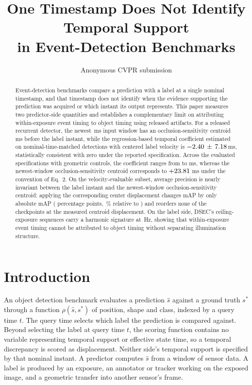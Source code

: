 \documentclass[10pt,twocolumn,letterpaper]{article}
\title{One Timestamp Does Not Identify Temporal Support\\
in Event-Detection Benchmarks}
\author{Anonymous CVPR submission}
\begin{document}
\maketitle

\begin{abstract}
Event-detection benchmarks compare a prediction with a label at a single
nominal timestamp, and that timestamp does not identify when the evidence
supporting the prediction was acquired or which instant its output represents.
This paper measures two predictor-side quantities and establishes a complementary
limit on attributing within-exposure event timing to object timing using released
artifacts. For a released
recurrent detector, the newest \rvtWindow\,ms input window has an
occlusion-sensitivity centroid \rvtCentroidMagMeas\,ms before the label instant,
while the regression-based temporal coefficient estimated on nominal-time-matched
detections with centered label velocity is
$-2.40\,\pm\,7.18$\,ms, statistically consistent with zero
under the reported specification. Across the evaluated specifications with
geometric controls, the coefficient ranges from \satLo{} to \satHi{} ms, whereas
the newest-window occlusion-sensitivity centroid corresponds to
$+23.81$ ms under the convention of Eq.~2. On the velocity-evaluable subset,
average precision is nearly invariant
between the label instant and the newest-window occlusion-sensitivity centroid:
applying the corresponding center displacement changes mAP by only
\mapCostAbs{} absolute mAP (\mapCost{} percentage points, \mapCostPct\,\%
relative to \mapZero{}) and reorders none of the \rankCkpts{} checkpoints at the
measured centroid displacement.
On the label side,
DSEC's ceiling-exposure sequences carry a harmonic signature at
\flickerLineHz\,Hz, showing that within-exposure event timing cannot be
attributed to object timing without separating illumination structure.
\end{abstract}

\section{Introduction}

An object detection benchmark evaluates a prediction $\hat{s}$ against a ground
truth $s^{*}$ through a function $\rho(\hat{s},s^{*})$ of position, shape and
class, indexed by a query time $t$. The query time selects which label the
prediction is compared against. Beyond selecting the label at query time $t$, the
scoring function contains no variable representing temporal support or effective state
time, so a temporal discrepancy is scored as displacement. Neither side's
temporal support is specified by that nominal instant. A predictor computes $\hat{s}$ from a
window of sensor data. A label is produced by an exposure, an annotator or
tracker working on the exposed image, and a geometric transfer into another
sensor's frame.
\end{document}
